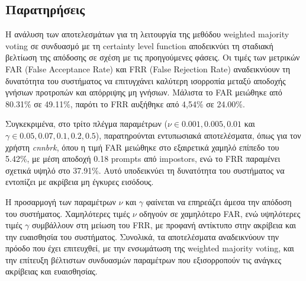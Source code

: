 \subsection{Παρατηρήσεις}
Η ανάλυση των αποτελεσμάτων για τη λειτουργία της μεθόδου weighted majority voting σε συνδυασμό με τη certainty level function αποδεικνύει τη σταδιακή βελτίωση της απόδοσης σε σχέση με τις προηγούμενες φάσεις. Οι τιμές των μετρικών FAR (False Acceptance Rate) και FRR (False Rejection Rate) αναδεικνύουν τη δυνατότητα του συστήματος να επιτυγχάνει καλύτερη ισορροπία μεταξύ αποδοχής γνήσιων προτροπών και απόρριψης μη γνήσιων. Μάλιστα το FAR μειώθηκε από 80.31\% σε 49.11\%, παρότι το FRR αυξήθηκε από 4,54\% σε 24.00\%.

Συγκεκριμένα, στο τρίτο πλέγμα παραμέτρων ($\nu \in {0.001, 0.005, 0.01}$ και $\gamma \in {0.05, 0.07, 0.1, 0.2, 0.5}$), παρατηρούνται εντυπωσιακά αποτελέσματα, όπως για τον χρήστη \textit{cnnbrk}, όπου η τιμή FAR μειώθηκε στο εξαιρετικά χαμηλό επίπεδο του 5.42\%, με μέση αποδοχή 0.18 prompts από impostors, ενώ το FRR παραμένει σχετικά υψηλό στο 37.91\%. Αυτό υποδεικνύει τη δυνατότητα του συστήματος να εντοπίζει με ακρίβεια μη έγκυρες εισόδους.

Η προσαρμογή των παραμέτρων $\nu$ και $\gamma$ φαίνεται να επηρεάζει άμεσα την απόδοση του συστήματος. Χαμηλότερες τιμές $\nu$ οδηγούν σε χαμηλότερο FAR, ενώ υψηλότερες τιμές $\gamma$ συμβάλλουν στη μείωση του FRR, με προφανή αντίκτυπο στην ακρίβεια και την ευαισθησία του συστήματος. Συνολικά, τα αποτελέσματα αναδεικνύουν την πρόοδο που έχει επιτευχθεί, με την ενσωμάτωση της weighted majority voting, και την επίτευξη βέλτιστων συνδυασμών παραμέτρων που εξισορροπούν τις ανάγκες ακρίβειας και ευαισθησίας.
